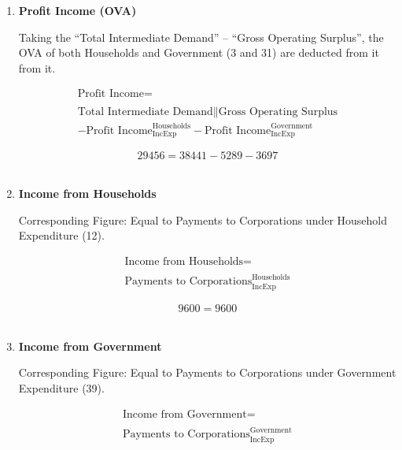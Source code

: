 \begin{enumerate}
\item \textbf {Profit Income (OVA)}

Taking the ``Total Intermediate Demand'' – ``Gross Operating Surplus'', the OVA of both Households and Government (3 and 31) are deducted from it from it.  \cite{ScotGov2013a,ONS2011b}

\begin{equation}
\begin{split}
\text{Profit Income} =  \\ \\
\text{Total Intermediate Demand}\|\text{Gross Operating Surplus}\\
-\text{Profit Income}^\text{Households}_\text{IncExp}-\text{Profit Income}^\text{Government}_\text{IncExp}
\end{split} \label{eq:2.5.23}
\end{equation}

\begin{equation} \nonumber
29456 = 38441-5289-3697
\end{equation}\\


\item \textbf {Income from Households}

Corresponding Figure: Equal to Payments to Corporations under Household Expenditure (12).

\begin{equation}
\begin{split}
\text{Income from Households} =  \\ \\
\text{Payments to Corporations}^\text{Households}_\text{IncExp}
\end{split} \label{eq:2.5.24}
\end{equation}

\begin{equation} \nonumber
9600 = 9600
\end{equation}\\


\item \textbf {Income from Government}

Corresponding Figure: Equal to Payments to Corporations under Government Expenditure (39).

\begin{equation}
\begin{split}
\text{Income from Government} =  \\ \\
\text{Payments to Corporations}^\text{Government}_\text{IncExp}
\end{split} \label{eq:2.5.25}
\end{equation}


\end{enumerate}
